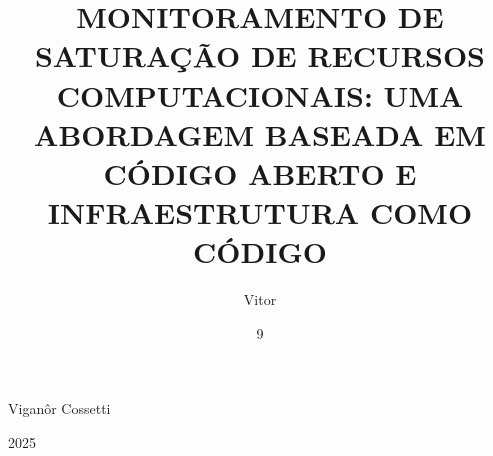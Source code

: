 \documentclass[grad,pdftex]{poli}
\begin{document}
  \title{MONITORAMENTO DE SATURAÇÃO DE RECURSOS COMPUTACIONAIS: UMA ABORDAGEM BASEADA EM CÓDIGO ABERTO E INFRAESTRUTURA COMO CÓDIGO}
  \author{Vitor}{Viganôr Cossetti}
  \date{9}{2025}
  \maketitle

  \frontmatter
  
  
  
  
  
  
  \renewcommand{\indexname}{Abreviaturas e Siglas}
  \begingroup
  \renewcommand{\addcontentsline}[3]{}
  \printloabbreviations
  \endgroup

  \tableofcontents

  \begingroup
  \renewcommand{\addcontentsline}[3]{}
  \listoffigures
  \listoftables
  \endgroup

  \mainmatter
  
  
  
  
  

  \backmatter
  
  
  \addcontentsline{toc}{chapter}{Bibliografia}
\end{document}
